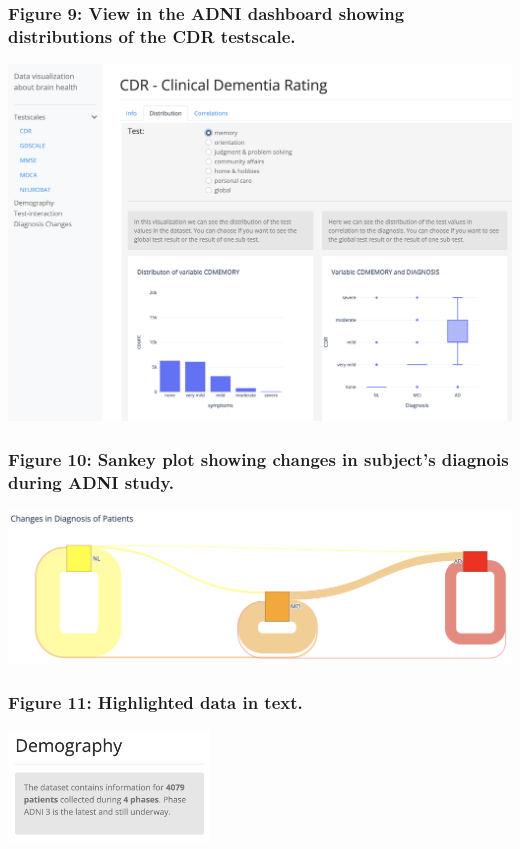 \documentclass[11pt]{article}
\begin{document}
\subsubsection{Figure 9: View in the ADNI dashboard showing distributions of the CDR testscale.}
\includegraphics{./adni-cdr.png}

\subsubsection{Figure 10: Sankey plot showing changes in subject's diagnois during ADNI study.}
\includegraphics{./sankey.png}

\subsubsection{Figure 11: Highlighted data in text.}
\includegraphics[width=0.4\textwidth]{./info-in-text.png}

\pagebreak
\printbibliography
\end{document}
